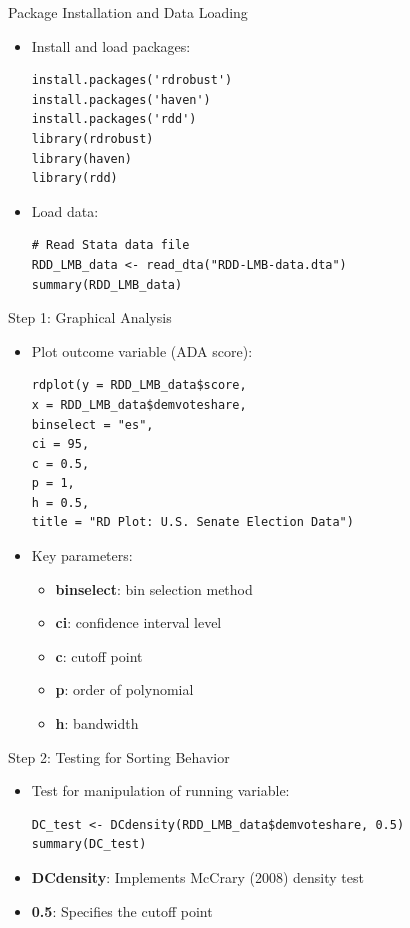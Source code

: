 \documentclass[hyperref={pdfpagelabels=false}]{beamer}
\begin{document}
\begin{frame}[fragile]{Package Installation and Data Loading}
	\begin{itemize}
		\item Install and load packages:
\begin{lstlisting}
install.packages('rdrobust')
install.packages('haven')
install.packages('rdd')
library(rdrobust)
library(haven)
library(rdd)
\end{lstlisting}
		
		\item Load data:
\begin{lstlisting}
# Read Stata data file
RDD_LMB_data <- read_dta("RDD-LMB-data.dta")
summary(RDD_LMB_data)
\end{lstlisting}
	\end{itemize}
\end{frame}

\begin{frame}[fragile]{Step 1: Graphical Analysis}
	\begin{itemize}
		\item Plot outcome variable (ADA score):
\begin{lstlisting}
rdplot(y = RDD_LMB_data$score, 
x = RDD_LMB_data$demvoteshare, 
binselect = "es",
ci = 95, 
c = 0.5,
p = 1,
h = 0.5, 
title = "RD Plot: U.S. Senate Election Data")
\end{lstlisting}
		
		\item Key parameters:
		\begin{itemize}
			\item \textbf{binselect}: bin selection method
			\item \textbf{ci}: confidence interval level
			\item \textbf{c}: cutoff point
			\item \textbf{p}: order of polynomial
			\item \textbf{h}: bandwidth
		\end{itemize}
	\end{itemize}
\end{frame}

\begin{frame}[fragile]{Step 2: Testing for Sorting Behavior}
	\begin{itemize}
		\item Test for manipulation of running variable:
\begin{lstlisting}
DC_test <- DCdensity(RDD_LMB_data$demvoteshare, 0.5)
summary(DC_test)
\end{lstlisting}
		
		\item \textbf{DCdensity}: Implements McCrary (2008) density test
		\item \textbf{0.5}: Specifies the cutoff point
	\end{itemize}
\end{frame}
\end{document}
